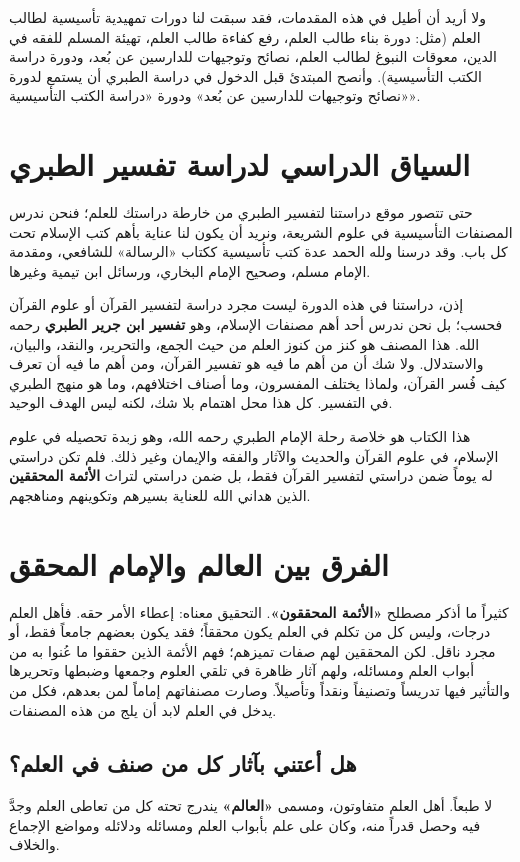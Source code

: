 ولا أريد أن أطيل في هذه المقدمات، فقد سبقت لنا دورات تمهيدية تأسيسية لطالب العلم (مثل: دورة بناء طالب العلم، رفع كفاءة طالب العلم، تهيئة المسلم للفقه في الدين، معوقات النبوغ لطالب العلم، نصائح وتوجيهات للدارسين عن بُعد، ودورة دراسة الكتب التأسيسية). وأنصح المبتدئ قبل الدخول في دراسة الطبري أن يستمع لدورة «نصائح وتوجيهات للدارسين عن بُعد» ودورة «دراسة الكتب التأسيسية».

\separator

\section*{السياق الدراسي لدراسة تفسير الطبري}
حتى تتصور موقع دراستنا لتفسير الطبري من خارطة دراستك للعلم؛ فنحن ندرس المصنفات التأسيسية في علوم الشريعة، ونريد أن يكون لنا عناية بأهم كتب الإسلام تحت كل باب. وقد درسنا ولله الحمد عدة كتب تأسيسية ككتاب «الرسالة» للشافعي، ومقدمة الإمام مسلم، وصحيح الإمام البخاري، ورسائل ابن تيمية وغيرها.

إذن، دراستنا في هذه الدورة ليست مجرد دراسة لتفسير القرآن أو علوم القرآن فحسب؛ بل نحن ندرس أحد أهم مصنفات الإسلام، وهو \textbf{تفسير ابن جرير الطبري} رحمه الله. هذا المصنف هو كنز من كنوز العلم من حيث الجمع، والتحرير، والنقد، والبيان، والاستدلال. ولا شك أن من أهم ما فيه هو تفسير القرآن، ومن أهم ما فيه أن تعرف كيف فُسر القرآن، ولماذا يختلف المفسرون، وما أصناف اختلافهم، وما هو منهج الطبري في التفسير. كل هذا محل اهتمام بلا شك، لكنه ليس الهدف الوحيد.

هذا الكتاب هو خلاصة رحلة الإمام الطبري رحمه الله، وهو زبدة تحصيله في علوم الإسلام، في علوم القرآن والحديث والآثار والفقه والإيمان وغير ذلك. فلم تكن دراستي له يوماً ضمن دراستي لتفسير القرآن فقط، بل ضمن دراستي لتراث \textbf{الأئمة المحققين} الذين هداني الله للعناية بسيرهم وتكوينهم ومناهجهم.

\section*{الفرق بين العالم والإمام المحقق}
كثيراً ما أذكر مصطلح \textbf{«الأئمة المحققون»}. التحقيق معناه: إعطاء الأمر حقه. فأهل العلم درجات، وليس كل من تكلم في العلم يكون محققاً؛ فقد يكون بعضهم جامعاً فقط، أو مجرد ناقل. لكن المحققين لهم صفات تميزهم؛ فهم الأئمة الذين حققوا ما عُنوا به من أبواب العلم ومسائله، ولهم آثار ظاهرة في تلقي العلوم وجمعها وضبطها وتحريرها والتأثير فيها تدريساً وتصنيفاً ونقداً وتأصيلاً. وصارت مصنفاتهم إماماً لمن بعدهم، فكل من يدخل في العلم لابد أن يلج من هذه المصنفات.

\subsection*{هل أعتني بآثار كل من صنف في العلم؟}
لا طبعاً. أهل العلم متفاوتون، ومسمى \textbf{«العالم»} يندرج تحته كل من تعاطى العلم وجدَّ فيه وحصل قدراً منه، وكان على علم بأبواب العلم ومسائله ودلائله ومواضع الإجماع والخلاف. 

